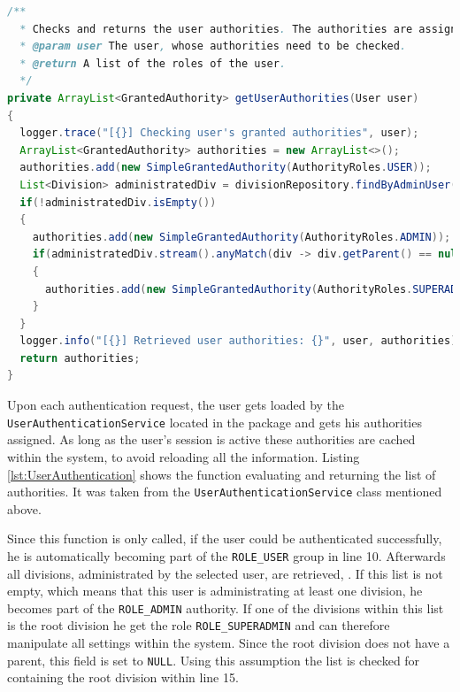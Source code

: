 \begin{lstlisting}[caption ={User role assessment executed upon authentication (slightly modified for readability)}, label=lst:UserAuthentication, language=Java]
/**
  * Checks and returns the user authorities. The authorities are assigned according to the {@link de.steilerdev.myVerein.server.security.UserAuthenticationService.AuthorityRoles AuthorityRoles} enum.
  * @param user The user, whose authorities need to be checked.
  * @return A list of the roles of the user.
  */
private ArrayList<GrantedAuthority> getUserAuthorities(User user)
{
  logger.trace("[{}] Checking user's granted authorities", user);
  ArrayList<GrantedAuthority> authorities = new ArrayList<>();
  authorities.add(new SimpleGrantedAuthority(AuthorityRoles.USER));
  List<Division> administratedDiv = divisionRepository.findByAdminUser(user);
  if(!administratedDiv.isEmpty())
  {
    authorities.add(new SimpleGrantedAuthority(AuthorityRoles.ADMIN));
    if(administratedDiv.stream().anyMatch(div -> div.getParent() == null))
    {
      authorities.add(new SimpleGrantedAuthority(AuthorityRoles.SUPERADMIN));
    }
  }
  logger.info("[{}] Retrieved user authorities: {}", user, authorities);
  return authorities;
}
\end{lstlisting}

Upon each authentication request, the user gets loaded by the \texttt{UserAuthenticationService} located in the  package and gets his authorities assigned. As long as the user's session is active these authorities are cached within the system, to avoid reloading all the information. Listing \ref{lst:UserAuthentication} shows the function evaluating and returning the list of authorities. It was taken from the \texttt{UserAuthenticationService} class mentioned above. 

Since this function is only called, if the user could be authenticated successfully, he is automatically becoming part of the \texttt{ROLE\_USER} group in line 10. Afterwards all divisions, administrated by the selected user, are retrieved, . If this list is not empty, which means that this user is administrating at least one division, he becomes part of the \texttt{ROLE\_ADMIN} authority. If one of the divisions within this list is the root division he get the role \texttt{ROLE\_SUPERADMIN} and can therefore manipulate all settings within the system. Since the root division does not have a parent, this field is set to \texttt{NULL}. Using this assumption the list is checked for containing the root division within line 15.

